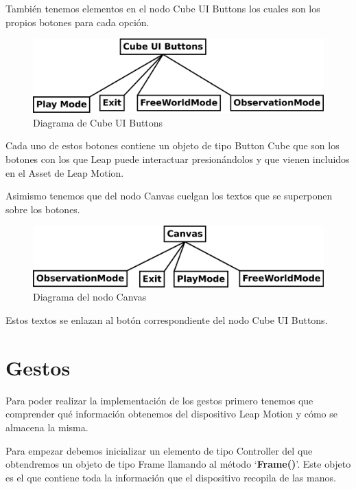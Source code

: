 \documentclass[a4paper,11pt]{article}
\begin{document}
\vspace{20px}

También tenemos elementos en el nodo Cube UI Buttons los cuales son los propios botones para cada opción.

\begin{figure}[!h]
	\includegraphics[scale=0.57]{./Imagenes/Cube_UI_Buttons.png}
	\caption{Diagrama de Cube UI Buttons}
	\label{cubeUIButtons}
\end{figure}

Cada uno de estos botones contiene un objeto de tipo Button Cube que son los botones con los que Leap puede interactuar presionándolos y que vienen incluidos en el Asset de Leap Motion.

\vspace{10px}

Asimismo tenemos que del nodo Canvas cuelgan los textos que se superponen sobre los botones.

\begin{figure}[!h]
	\includegraphics[scale=0.56]{./Imagenes/Canvas.png}
	\caption{Diagrama del nodo Canvas}
	\label{canvas}
\end{figure}

Estos textos se enlazan al botón correspondiente del nodo Cube UI Buttons.

\section{Gestos}

Para poder realizar la implementación de los gestos primero tenemos que comprender qué información obtenemos del dispositivo Leap Motion y cómo se almacena la misma. 

\vspace{10px}

Para empezar debemos inicializar un elemento de tipo Controller del que obtendremos un objeto de tipo Frame llamando al método `\textbf{Frame()}'. Este objeto es el que contiene toda la información que el dispositivo recopila de las manos.
\end{document}
